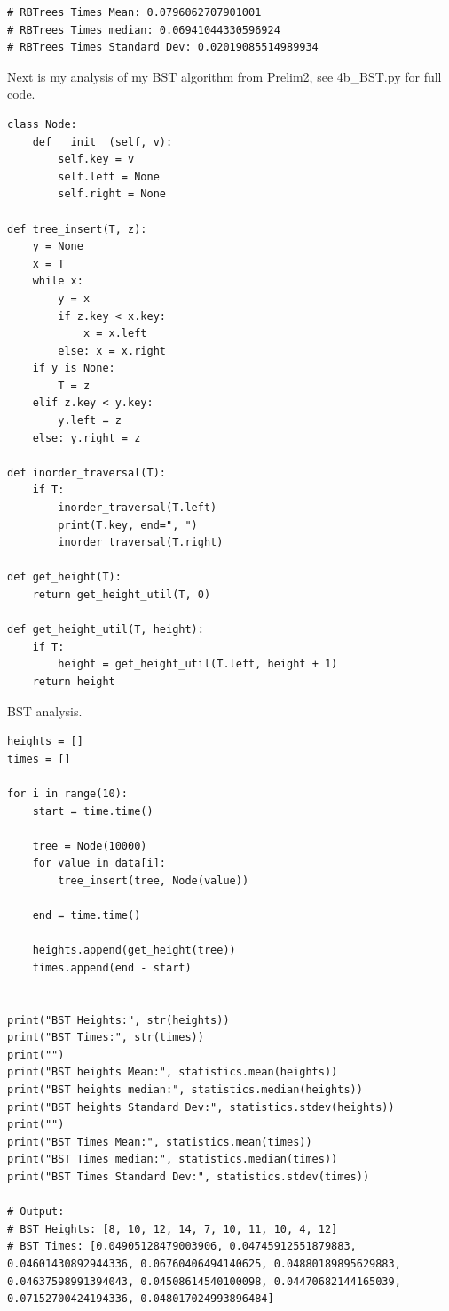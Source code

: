 \documentclass{article}
\begin{document}
\begin{enumerate}
\begin{enumerate}
\begin{lstlisting}
# RBTrees Times Mean: 0.0796062707901001
# RBTrees Times median: 0.06941044330596924
# RBTrees Times Standard Dev: 0.02019085514989934
      \end{lstlisting}

      Next is my analysis of my BST algorithm from Prelim2, see 4b\_BST.py for full code.

    \begin{lstlisting}
class Node: 
    def __init__(self, v): 
        self.key = v 
        self.left = None
        self.right = None
                
def tree_insert(T, z): 
    y = None
    x = T
    while x:
        y = x
        if z.key < x.key:
            x = x.left
        else: x = x.right
    if y is None:
        T = z
    elif z.key < y.key:
        y.left = z
    else: y.right = z
                
def inorder_traversal(T): 
    if T: 
        inorder_traversal(T.left) 
        print(T.key, end=", ") 
        inorder_traversal(T.right)
        
def get_height(T):
    return get_height_util(T, 0)

def get_height_util(T, height):
    if T:
        height = get_height_util(T.left, height + 1)
    return height
    \end{lstlisting}

    BST analysis.

    \begin{lstlisting}
heights = []
times = []

for i in range(10):
    start = time.time()
    
    tree = Node(10000)
    for value in data[i]:
        tree_insert(tree, Node(value))
    
    end = time.time()
    
    heights.append(get_height(tree))
    times.append(end - start)

    
print("BST Heights:", str(heights))
print("BST Times:", str(times))
print("")
print("BST heights Mean:", statistics.mean(heights))
print("BST heights median:", statistics.median(heights))
print("BST heights Standard Dev:", statistics.stdev(heights))
print("")
print("BST Times Mean:", statistics.mean(times))
print("BST Times median:", statistics.median(times))
print("BST Times Standard Dev:", statistics.stdev(times))

# Output:
# BST Heights: [8, 10, 12, 14, 7, 10, 11, 10, 4, 12]
# BST Times: [0.04905128479003906, 0.04745912551879883, 0.04601430892944336, 0.06760406494140625, 0.04880189895629883, 0.04637598991394043, 0.04508614540100098, 0.04470682144165039, 0.07152700424194336, 0.048017024993896484]


\end{lstlisting}
\end{enumerate}
\end{enumerate}
\end{document}
